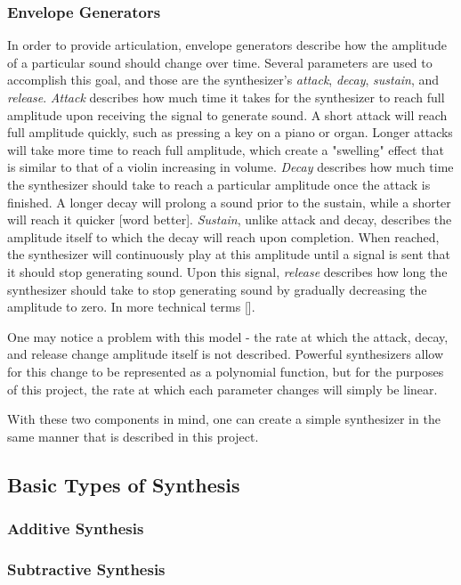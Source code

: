 \documentclass[12pt]{article}
\begin{document}
\subsubsection{Envelope Generators}
In order to provide articulation, envelope generators describe how the amplitude of a particular sound should change over time. Several parameters are used to accomplish this goal, and those are the synthesizer's \textit{attack}, \textit{decay}, \textit{sustain}, and \textit{release}. \textit{Attack} describes how much time it takes for the synthesizer to reach full amplitude upon receiving the signal to generate sound. A short attack will reach full amplitude quickly, such as pressing a key on a piano or organ. Longer attacks will take more time to reach full amplitude, which create a "swelling" effect that is similar to that of a violin increasing in volume. \textit{Decay} describes how much time the synthesizer should take to reach a particular amplitude once the attack is finished. A longer decay will prolong a sound prior to the sustain, while a shorter will reach it quicker [word better]. \textit{Sustain}, unlike attack and decay, describes the amplitude itself to which the decay will reach upon completion. When reached, the synthesizer will continuously play at this amplitude until a signal is sent that it should stop generating sound. Upon this signal, \textit{release} describes how long the synthesizer should take to stop generating sound by gradually decreasing the amplitude to zero. In more technical terms []. 

One may notice a problem with this model - the rate at which the attack, decay, and release change amplitude itself is not described. Powerful synthesizers allow for this change to be represented as a polynomial function, but for the purposes of this project, the rate at which each parameter changes will simply be linear. 

With these two components in mind, one can create a simple synthesizer in the same manner that is described in this project.

\subsection{Basic Types of Synthesis}

\subsubsection{Additive Synthesis}

\subsubsection{Subtractive Synthesis}
\end{document}
